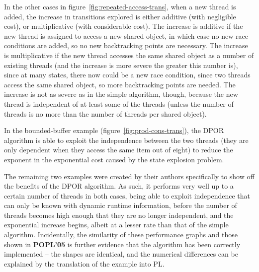 \documentclass[12pt,a4paper,twoside,openright]{report}
\begin{document}
In the other cases in
figure~\ref{fig:repeated-access-trans},
when a new thread is added, the increase
in transitions explored
is either additive (with negligible cost),
or multiplicative (with considerable cost).
The increase is additive if the new thread
is assigned to access a new shared object,
in which case no new race conditions are
added, so no new backtracking points are
necessary. The increase is multiplicative
if the new thread accesses the same shared
object as a number of existing threads
(and the increase is more severe the greater
this number is), since at many states, there
now could be a new race condition, since
two threads access the same shared object,
so more backtracking points are needed.
The increase is not as severe as in the
simple algorithm, though, because the new
thread is independent of at least some of
the threads (unless the number of threads
is no more than the number of threads
per shared object).

In the bounded-buffer example
(figure~\ref{fig:prod-cons-trans}),
the DPOR algorithm is able to exploit
the independence between the two threads
(they are only dependent when they
access the same item out of eight) to
reduce the exponent in the
exponential cost caused by the
state explosion problem.

The remaining two examples were created
by their authors specifically to show
off the benefits of the DPOR algorithm.
As such, it performs very well up to
a certain number of threads in both cases,
being able to exploit independence that can
only be known with dynamic runtime information,
before the number of threads becomes high enough
that they are no longer independent, and the
exponential increase begins, albeit at a lesser
rate than that of the simple algorithm.
Incidentally, the similarity of these performance
graphs and those shown in \textbf{POPL'05}
is further evidence that the algorithm has
been correctly implemented -- the shapes
are identical, and the numerical
differences can be explained by the
translation of the example into PL.
\end{document}
